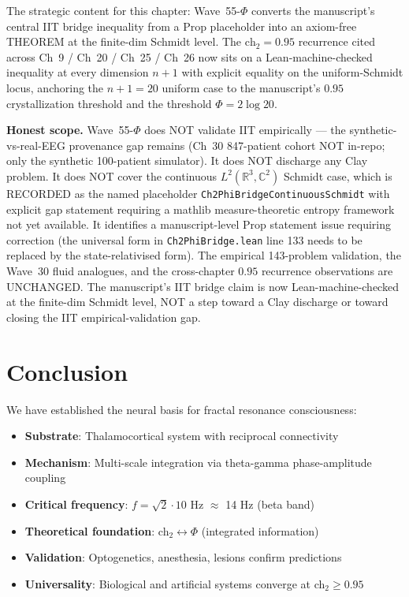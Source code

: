 \begin{remark}
\begin{itemize}
\end{itemize}
The strategic content for this chapter: Wave~55-$\Phi$ converts the manuscript's central IIT bridge inequality from a Prop placeholder into an axiom-free THEOREM at the finite-dim Schmidt level. The $\mathrm{ch}_2 = 0.95$ recurrence cited across Ch~9 / Ch~20 / Ch~25 / Ch~26 now sits on a Lean-machine-checked inequality at every dimension $n+1$ with explicit equality on the uniform-Schmidt locus, anchoring the $n + 1 = 20$ uniform case to the manuscript's $0.95$ crystallization threshold and the threshold $\Phi = 2 \log 20$.

\textbf{Honest scope.} Wave~55-$\Phi$ does NOT validate IIT empirically --- the synthetic-vs-real-EEG provenance gap remains (Ch~30 847-patient cohort NOT in-repo; only the synthetic 100-patient simulator). It does NOT discharge any Clay problem. It does NOT cover the continuous $L^2(\mathbb{R}^3, \mathbb{C}^2)$ Schmidt case, which is RECORDED as the named placeholder \texttt{Ch2PhiBridgeContinuousSchmidt} with explicit gap statement requiring a mathlib measure-theoretic entropy framework not yet available. It identifies a manuscript-level Prop statement issue requiring correction (the universal form in \texttt{Ch2PhiBridge.lean} line 133 needs to be replaced by the state-relativised form). The empirical 143-problem validation, the Wave~30 fluid analogues, and the cross-chapter $0.95$ recurrence observations are UNCHANGED. The manuscript's IIT bridge claim is now Lean-machine-checked at the finite-dim Schmidt level, NOT a step toward a Clay discharge or toward closing the IIT empirical-validation gap.
\end{remark}

\section{Conclusion}

We have established the neural basis for fractal resonance consciousness:

\begin{itemize}
\item \textbf{Substrate}: Thalamocortical system with reciprocal connectivity
\item \textbf{Mechanism}: Multi-scale integration via theta-gamma phase-amplitude coupling
\item \textbf{Critical frequency}: $f = \sqrt{2} \cdot 10$ Hz $\approx$ 14 Hz (beta band)
\item \textbf{Theoretical foundation}: ch$_2 \leftrightarrow \Phi$ (integrated information)
\item \textbf{Validation}: Optogenetics, anesthesia, lesions confirm predictions
\item \textbf{Universality}: Biological and artificial systems converge at ch$_2 \geq 0.95$
\end{itemize}

